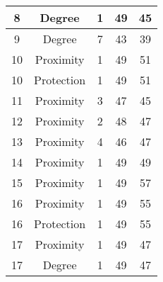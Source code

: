 \documentclass[results.tex]{subfiles}
\begin{document}
\begin{center}
\begin{tabular}{| c || c | c | c | c |}
            \hline
            8                       & Degree                       & 1                      & 49                      & 45                   \\
            \hline
            9                       & Degree                       & 7                      & 43                      & 39                   \\
            \hline
            10                      & Proximity                    & 1                      & 49                      & 51                   \\
            \hline
            10                      & Protection                   & 1                      & 49                      & 51                   \\
            \hline
            11                      & Proximity                    & 3                      & 47                      & 45                   \\
            \hline
            12                      & Proximity                    & 2                      & 48                      & 47                   \\
            \hline
            13                      & Proximity                    & 4                      & 46                      & 47                   \\
            \hline
            14                      & Proximity                    & 1                      & 49                      & 49                   \\
            \hline
            15                      & Proximity                    & 1                      & 49                      & 57                   \\
            \hline
            16                      & Proximity                    & 1                      & 49                      & 55                   \\
            \hline
            16                      & Protection                   & 1                      & 49                      & 55                   \\
            \hline
            17                      & Proximity                    & 1                      & 49                      & 47                   \\
            \hline
            17                      & Degree                       & 1                      & 49                      & 47                   \\

\end{tabular}
\end{center}
\end{document}
